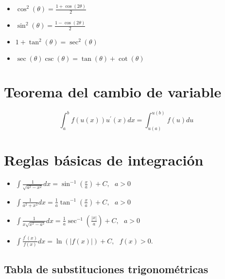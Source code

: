 \documentclass[twoside,landscape,letterpaper,twocolumn,13pt]{book}
\begin{document}
\begin{itemize}
    \item $\displaystyle{\cos^{2}(\theta) = \frac{1+ \cos(2\theta)}{2}}$

    \item $\displaystyle{\sin^{2}(\theta) = \frac{1- \cos(2\theta)}{2}}$

    \item $1 + \tan^{2}(\theta) = \sec^{2}(\theta)$

    \item $\sec(\theta) \csc(\theta) = \tan(\theta) +  \cot(\theta)$
    
    
\end{itemize}

\section*{Teorema del cambio de variable}

\begin{equation*}
    \displaystyle{\int_{a}^{b} f(u(x))u^{'}(x) dx = \int_{u(a)}^{u(b)} f(u)du  }
\end{equation*}


\section*{Reglas básicas de integración}

\begin{itemize}
    
    \item $\displaystyle{\int \frac{1}{\sqrt{a^{2} - x^{2}}} dx } = \sin^{-1}\left(\frac{x}{a}\right) + C, \, \, \, \, a >0$

    \item $\displaystyle{\int \frac{1}{a^{2} + x^{2}} dx } = \frac{1}{a} \tan^{-1}\left(\frac{x}{a}\right) + C, \,  \, \, \, a >0$

     \item $\displaystyle{\int \frac{1}{x\sqrt{x^{2} - a^{2}}}dx} = \frac{1}{a} \sec^{-1}\left(\frac{|x|}{a}\right) + C, \,  \, \, \, a >0$

     \item $\displaystyle{\int \frac{f^{'}(x)}{f(x)} dx = \ln(|f(x)|) + C,\,\,\,\, f(x) > 0.}$

     
     
\end{itemize}

\subsection*{Tabla de substituciones trigonométricas}
\end{document}
